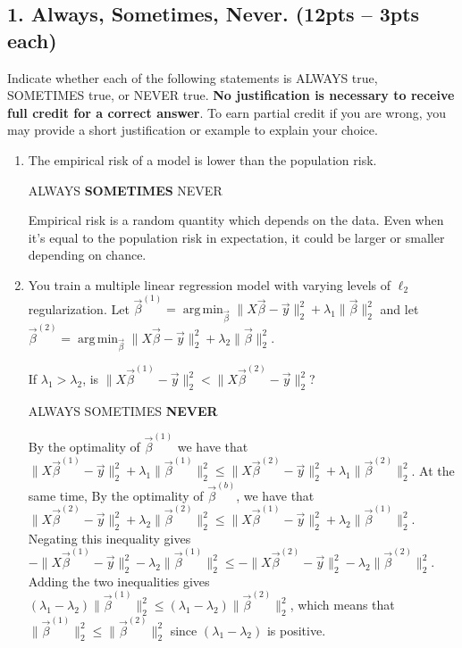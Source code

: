 \documentclass[10pt]{article}
\DeclareMathOperator*{\argmin}{arg\,min}
\begin{document}
\subsection{1. Always, Sometimes, Never. (\textbf{\small 12pts -- 3pts each})} 
Indicate whether each of the following statements is ALWAYS true, SOMETIMES true, or NEVER true. \textbf{No justification is necessary to receive full credit for a correct answer}. To earn partial credit if you are wrong, you may provide a short justification or example to explain your choice.
\begin{enumerate}[label=(\alph*)]
	\item The empirical risk of a model is lower than the population risk.
	
	ALWAYS\hspace{1em} \textbf{SOMETIMES}\hspace{1em} NEVER
	
	\color{blue}
	Empirical risk is a random quantity which depends on the data. Even when it's equal to the population risk in expectation, it could be larger or smaller depending on chance.
	\color{black}
	\vspace{1em}
	
	\item You train a multiple linear regression model with varying levels of $\ell_2$ regularization. Let $\vec{\beta}^{(1)} = \argmin_{\vec{\beta}}  \|X\vec{\beta} - \vec{y}\|_2^2 + \lambda_1 \|\vec{\beta}\|_2^2$ and let $\vec{\beta}^{(2)} = \argmin_{\vec{\beta}}  \|X\vec{\beta} - \vec{y}\|_2^2 + \lambda_2 \|\vec{\beta}\|_2^2$. 
	
	If $\lambda_1 > \lambda_2$, is $\|X\vec{\beta}^{(1)}  - \vec{y}\|_2^2 < \|X\vec{\beta}^{(2)}  - \vec{y}\|_2^2$?

	ALWAYS\hspace{1em} SOMETIMES\hspace{1em} \textbf{NEVER}
	
	\color{blue}
	By the optimality of $\vec{\beta}^{(1)}$ we have that $\|X\vec{\beta}^{(1)} - \vec{y}\|_2^2 + \lambda_1 \|\vec{\beta}^{(1)}\|_2^2 \leq \|X\vec{\beta}^{(2)} - \vec{y}\|_2^2 + \lambda_1 \|\vec{\beta}^{(2)}\|_2^2$. At the same time, By the optimality of $\vec{\beta}^{(b)}$, we have that  $\|X\vec{\beta}^{(2)} - \vec{y}\|_2^2 + \lambda_2 \|\vec{\beta}^{(2)}\|_2^2 \leq \|X\vec{\beta}^{(1)} - \vec{y}\|_2^2 + \lambda_2 \|\vec{\beta}^{(1)}\|_2^2$. Negating this inequality gives $-\|X\vec{\beta}^{(1)} - \vec{y}\|_2^2 - \lambda_2 \|\vec{\beta}^{(1)}\|_2^2 \leq -\|X\vec{\beta}^{(2)} - \vec{y}\|_2^2 - \lambda_2 \|\vec{\beta}^{(2)}\|_2^2$. Adding the two inequalities gives $(\lambda_1-\lambda_2) \|\vec{\beta}^{(1)}\|_2^2 \leq (\lambda_1-\lambda_2)  \|\vec{\beta}^{(2)}\|_2^2$, which means that $ \|\vec{\beta}^{(1)}\|_2^2 \leq  \|\vec{\beta}^{(2)}\|_2^2$ since $(\lambda_1 - \lambda_2)$ is positive.
	

\end{enumerate}
\end{document}
